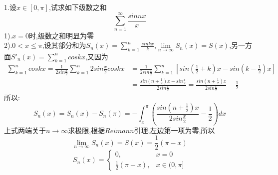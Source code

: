 \documentclass{ctexart}
\begin{document}
\begin{tcolorbox}[title = {求和问题},colbacktitle=red!35!white,colback=white,arc = 3mm, outer arc = 3mm,fonttitle = \itshape, fontupper = \itshape, fontlower = \itshape]
  1.设$x \in [0,\pi]$,试求如下级数之和$$\sum_{n=1}^{\infty}\frac{sinnx}{x}$$
  1).$x=0$时,级数之和明显为零\\
  2).$0 < x \le \pi$,设其部分和为$S_{n}(x)=\sum\limits_{k=1}^{n}\frac{sinkx}{k}$,$\lim\limits_{n \to \infty }S_{n}(x) =S(x)$,另一方面$S'_{n}(x)=\sum\limits_{k=1}^{n}coskx$,又因为
  \begin{align*}
  	 \sum\limits_{k=1}^{n}coskx=\frac{1}{2sin\frac{x}{2}} \sum\limits_{k=1}^{n}2sin\frac{x}{2}coskx&=\frac{1}{2sin\frac{x}{2}}\sum\limits_{k=1}^{n} \left[sin\left( \frac{1}{2}+k\right) x-sin\left( k-\frac{1}{2}\right) x\right]\\
  	  &=\frac{sin\left(n+\frac{1}{2}\right)x-sin\frac{x}{2} }{2sin\frac{x}{2}}=\frac{sin\left(n+\frac{1}{2}\right)x}{2sin\frac{x}{2} }-\frac{1}{2}
  \end{align*}
所以:
  $$S_{n}(x)=S_{n}(x)-S_{n}(\pi)=-\int_{x}^{\pi}\left(\frac{sin\left(n+\frac{1}{2}\right)x}{2sin\frac{x}{2} }-\frac{1}{2} \right)dx $$
  上式两端关于$n \to \infty$求极限,根据$Reimann$引理,左边第一项为零,所以
   $$\lim\limits_{n \to \infty }S_{n}(x) =S(x)=\frac{1}{2}\left(\pi-x \right) $$
  $$ S_{n}(x)=\left\{\begin{matrix} 
   	0,&x=0 \\  
   	\frac{1}{2}(\pi-x),&x \in(0,\pi ]
   \end{matrix}\right. 
$$


\end{tcolorbox}
\end{document}
